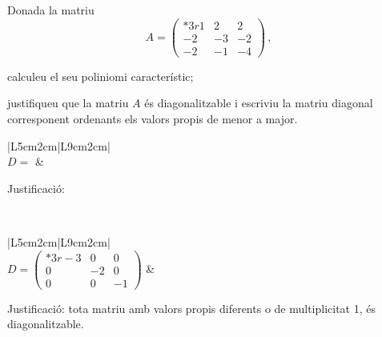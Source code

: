 \documentclass[10pt,catalan]{article}
\begin{document}
\begin{enunciat}
Donada la matriu
\[
   A=\begin{pmatrix}{*{3}r} 1 & 2 & 2\\ -2 & -3 & -2\\ -2 & -1 & -4\end{pmatrix}\,,
\]
\begin{apartats}
\item calculeu el seu poliniomi característic;
\item justifiqueu que la matriu $A$ és diagonalitzable i escriviu la matriu diagonal corresponent  ordenants els valors propis de menor a major.
\end{apartats}
\end{enunciat}

\begin{quadricula}
\begin{tabular}{|L{5cm}{2cm}|L{9cm}{2cm}|}
\hline
{} \\
\hline
$D=$ & \begin{minipage}[t]{8.8cm}Justificació:\vspace{1.8cm} \end{minipage}\\
\hline
\end{tabular}
\end{quadricula}

\begin{solucio}
\begin{center}
\begin{tabular}{|L{5cm}{2cm}|L{9cm}{2cm}|}
\hline
{} \\
\hline
$D=\begin{pmatrix}{*{3}r} -3 & 0 & 0\\ 0 & -2 & 0\\ 0 & 0 & -1\end{pmatrix}$ & 
\begin{minipage}[t]{8.8cm}
Justificació: tota matriu amb valors propis diferents o de multiplicitat 1, és diagonalitzable.
\vspace{1cm}
\end{minipage} \\
\hline
\end{tabular}
\end{center}
\end{solucio}
\end{document}
